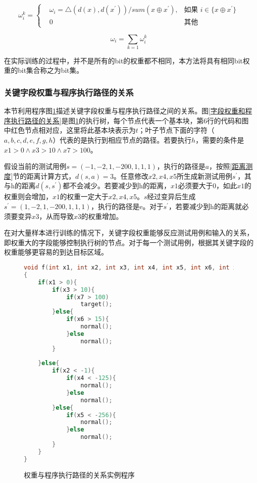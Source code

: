 \begin{equation}\label{bit权重计算}
\omega^{k}_{i}=\left\{
\begin{aligned}
& \omega_{i} = \bigtriangleup (d(x),d(x^{'}))/sum(x \oplus x^{'}), & \text{如果 } i \in \{ x \oplus x^{'} \}\\
& 0 & \text{其他}
\end{aligned}
\right.
\end{equation} 

\begin{equation}\label{bit权重累积}
\omega_{i} = \sum_{k=1} \omega^{k}_{i}
\end{equation}

在实际训练的过程中，并不是所有的bit的权重都不相同，本方法将具有相同bit权重的bit集合称之为bit集。

\subsubsection{关键字段权重与程序执行路径的关系}

本节利用程序图\ref{权重与程序执行路径的关系实例程序}描述关键字段权重与程序执行路径之间的关系。图\ref{字段权重和程序执行路径的关系}是图\ref{权重与程序执行路径的关系实例程序}的执行树，每个节点代表一个基本块，第6行的代码和图中红色节点相对应，这里将此基本块表示为$t$；叶子节点下面的字符（$a,b,c,d,e,f,g,h$）代表的是执行到相应节点的路径。若要执行$h$，需要的条件是$x1>0 \wedge x3>10 \wedge x7>100$。

假设当前的测试用例$s=(-1,-2,1,-200,1,1,1)$，执行的路径是$a$，按照\ref{距离测度}节的距离计算方式，$d(s,a) = 3$。任意修改$x2,x4,x5$所生成新测试用例$s^{'}$，其与h的距离$d(s,s^{'})$都不会减少。若要减少到h的距离，$x1$必须要大于0，如此$x1$的权重则会增加，$x1$的权重一定大于$x2,x4,x5$。$s$经过变异后生成$s^{'}=(1,-2,1,-200,1,1,1)$，执行的路径是e。对于$s^{'}$，若要减少到h的距离就必须要变异$x3$，从而导致$x3$的权重增加。

在对大量样本进行训练的情况下，关键字段权重能够反应测试用例和输入的关系，即权重大的字段能够控制执行树的节点。对于每一个测试用例，根据其关键字段的权重能够更容易的到达目标区域。

\begin{figure}[h]
\begin{lstlisting}[language=C]
void f(int x1, int x2, int x3, int x4, int x5, int x6, int x7)
{
	if(x1 > 0){
		if(x3 > 10){
			if(x7 > 100)
				target();
		}else{
			if(x6 > 15){
				normal();
			}else
				normal();
		}
			
	}else{
		if(x2 < -1){
			if(x4 < -125){
				normal();
			}else
				normal();
		}else{
			if(x5 < -256){
				normal();
			}else
				normal();
		}
	}
}
\end{lstlisting}
\caption{权重与程序执行路径的关系实例程序}
\label{权重与程序执行路径的关系实例程序}
\end{figure}



